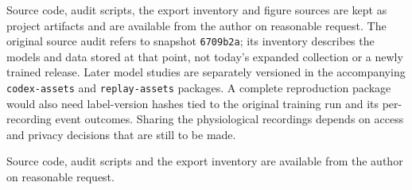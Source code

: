 \iffull
Source code, audit scripts, the export inventory and figure sources are kept as project artifacts and are available from the author on reasonable request. The original source audit refers to snapshot \nolinkurl{6709b2a}; its inventory describes the models and data stored at that point, not today's expanded collection or a newly trained release. Later model studies are separately versioned in the accompanying \nolinkurl{codex-assets} and \nolinkurl{replay-assets} packages. A complete reproduction package would also need label-version hashes tied to the original training run and its per-recording event outcomes. Sharing the physiological recordings depends on access and privacy decisions that are still to be made.

\else
Source code, audit scripts and the export inventory are available from the author on reasonable request.
\fi